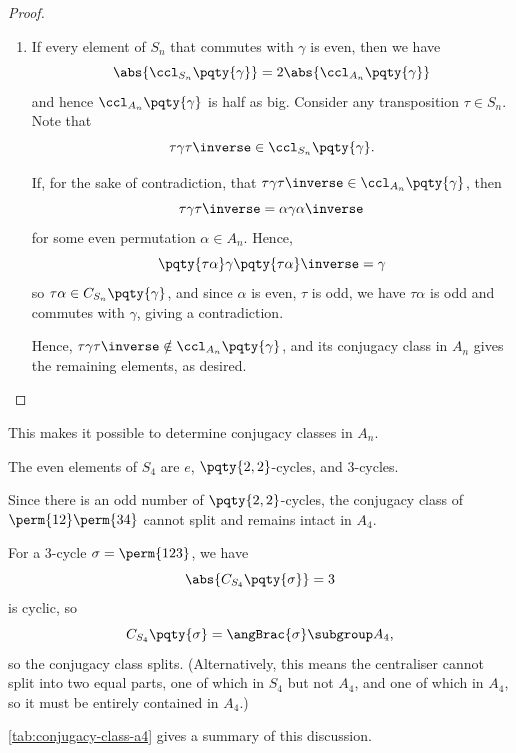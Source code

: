 \begin{proof}
\begin{enumerate}
        \item If every element of \(S_n\) that commutes with \(\gamma\) is even, then we have
        \[
            \abs{\ccl_{S_n} \pqty{\gamma}} = 2 \abs{\ccl_{A_n} \pqty{\gamma}}
        \]
        and hence \(\ccl_{A_n} \pqty{\gamma}\) is half as big. Consider any transposition \(\tau \in S_n\). Note that
        \[
            \tau \gamma \tau\inverse \in \ccl_{S_n} \pqty{\gamma}.
        \]

        If, for the sake of contradiction, that \(\tau \gamma \tau\inverse \in \ccl_{A_n}\pqty{\gamma}\), then
        \[
            \tau \gamma \tau\inverse = \alpha \gamma \alpha\inverse
        \]
        for some even permutation \(\alpha \in A_n\). Hence,
        \[
            \pqty{\tau \alpha} \gamma \pqty{\tau \alpha}\inverse = \gamma
        \]
        so \(\tau \alpha \in C_{S_n} \pqty{\gamma}\), and since \(\alpha\) is even, \(\tau\) is odd, we have \(\tau \alpha\) is odd and commutes with \(\gamma\), giving a contradiction.

        Hence, \(\tau \gamma \tau\inverse \notin \ccl_{A_n} \pqty{\gamma}\), and its conjugacy class in \(A_n\) gives the remaining elements, as desired.
    \end{enumerate}
\end{proof}

This makes it possible to determine conjugacy classes in \(A_n\).

\begin{example*}
    The even elements of \(S_4\) are \(e\), \(\pqty{2, 2}\)-cycles, and \(3\)-cycles.

    Since there is an odd number of \(\pqty{2, 2}\)-cycles, the conjugacy class of \(\perm{12}\perm{34}\) cannot split and remains intact in \(A_4\).

    For a \(3\)-cycle \(\sigma = \perm{123}\), we have
    \[
        \abs{C_{S_4} \pqty{\sigma}} = 3
    \]
    is cyclic, so
    \[
        C_{S_4} \pqty{\sigma} = \angBrac{\sigma} \subgroup A_4,
    \]
    so the conjugacy class splits. (Alternatively, this means the centraliser cannot split into two equal parts, one of which in \(S_4\) but not \(A_4\), and one of which in \(A_4\), so it must be entirely contained in \(A_4\).)

    \autoref{tab:conjugacy-class-a4} gives a summary of this discussion.
\end{example*}

